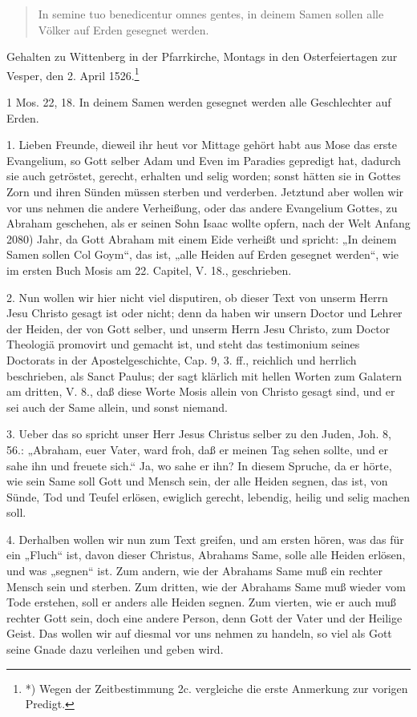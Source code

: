\begin{quote}
In semine tuo benedicentur omnes gentes, in deinem Samen sollen alle Völker auf Erden gesegnet werden.
\end{quote}

Gehalten zu Wittenberg in der Pfarrkirche, Montags in den Osterfeiertagen zur Vesper, den 2. April 1526.\footnote{*) Wegen der Zeitbestimmung 2c. vergleiche die erste Anmerkung zur vorigen Predigt.}

1 Mos. 22, 18. In deinem Samen werden gesegnet werden alle Geschlechter auf Erden.

1. Lieben Freunde, dieweil ihr heut vor Mittage gehört habt aus Mose das erste Evangelium, so Gott selber Adam und Even im Paradies gepredigt hat, dadurch sie auch getröstet, gerecht, erhalten und selig worden; sonst hätten sie in Gottes Zorn und ihren Sünden müssen sterben und verderben. Jetztund aber wollen wir vor uns nehmen die andere Verheißung, oder das andere Evangelium Gottes, zu Abraham geschehen, als er seinen Sohn Isaac wollte opfern, nach der Welt Anfang 2080) Jahr, da Gott Abraham mit einem Eide verheißt und spricht: „In deinem Samen sollen Col Goym“, das ist, „alle Heiden auf Erden gesegnet werden“, wie im ersten Buch Mosis am 22. Capitel, V. 18., geschrieben.

2. Nun wollen wir hier nicht viel disputiren, ob dieser Text von unserm Herrn Jesu Christo gesagt ist oder nicht; denn da haben wir unsern Doctor und Lehrer der Heiden, der von Gott selber, und unserm Herrn Jesu Christo, zum Doctor Theologiä promovirt und gemacht ist, und steht das testimonium seines Doctorats in der Apostelgeschichte, Cap. 9, 3. ff., reichlich und herrlich beschrieben, als Sanct Paulus; der sagt klärlich mit hellen Worten zum Galatern am dritten, V. 8., daß diese Worte Mosis allein von Christo gesagt sind, und er sei auch der Same allein, und sonst niemand.

3. Ueber das so spricht unser Herr Jesus Christus selber zu den Juden, Joh. 8, 56.: „Abraham, euer Vater, ward froh, daß er meinen Tag sehen sollte, und er sahe ihn und freuete sich.“ Ja, wo sahe er ihn? In diesem Spruche, da er hörte, wie sein Same soll Gott und Mensch sein, der alle Heiden segnen, das ist, von Sünde, Tod und Teufel erlösen, ewiglich gerecht, lebendig, heilig und selig machen soll.

4. Derhalben wollen wir nun zum Text greifen, und am ersten hören, was das für ein „Fluch“ ist, davon dieser Christus, Abrahams Same, solle alle Heiden erlösen, und was „segnen“ ist. Zum andern, wie der Abrahams Same muß ein rechter Mensch sein und sterben. Zum dritten, wie der Abrahams Same muß wieder vom Tode erstehen, soll er anders alle Heiden segnen. Zum vierten, wie er auch muß rechter Gott sein, doch eine andere Person, denn Gott der Vater und der Heilige Geist. Das wollen wir auf diesmal vor uns nehmen zu handeln, so viel als Gott seine Gnade dazu verleihen und geben wird.

